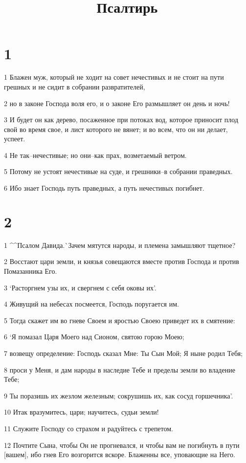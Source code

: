 

\title{Псалтирь}


\chapter{1}

\par 1 Блажен муж, который не ходит на совет нечестивых и не стоит на пути грешных и не сидит в собрании развратителей,
\par 2 но в законе Господа воля его, и о законе Его размышляет он день и ночь!
\par 3 И будет он как дерево, посаженное при потоках вод, которое приносит плод свой во время свое, и лист которого не вянет; и во всем, что он ни делает, успеет.
\par 4 Не так--нечестивые; но они--как прах, возметаемый ветром.
\par 5 Потому не устоят нечестивые на суде, и грешники--в собрании праведных.
\par 6 Ибо знает Господь путь праведных, а путь нечестивых погибнет.

\chapter{2}

\par 1 ^^Псалом Давида.^^ Зачем мятутся народы, и племена замышляют тщетное?
\par 2 Восстают цари земли, и князья совещаются вместе против Господа и против Помазанника Его.
\par 3 `Расторгнем узы их, и свергнем с себя оковы их'.
\par 4 Живущий на небесах посмеется, Господь поругается им.
\par 5 Тогда скажет им во гневе Своем и яростью Своею приведет их в смятение:
\par 6 `Я помазал Царя Моего над Сионом, святою горою Моею;
\par 7 возвещу определение: Господь сказал Мне: Ты Сын Мой; Я ныне родил Тебя;
\par 8 проси у Меня, и дам народы в наследие Тебе и пределы земли во владение Тебе;
\par 9 Ты поразишь их жезлом железным; сокрушишь их, как сосуд горшечника'.
\par 10 Итак вразумитесь, цари; научитесь, судьи земли!
\par 11 Служите Господу со страхом и радуйтесь с трепетом.
\par 12 Почтите Сына, чтобы Он не прогневался, и чтобы вам не погибнуть в пути [вашем], ибо гнев Его возгорится вскоре. Блаженны все, уповающие на Него.

